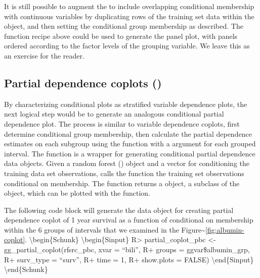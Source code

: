 \documentclass[article]{jss}
\begin{document}
It is still possible to augment the  to include
overlapping conditional membership with continuous variables by
duplicating rows of the training set data within the 
object, and then setting the conditional group membership as described.
The  function recipe above could be used to
generate the panel plot, with panels ordered according to the factor
levels of the grouping variable. We leave this as an exercise for the
reader.

\subsection[Partial dependence coplots]{Partial dependence coplots ()}\label{S:partialcoplots}

By characterizing conditional plots as stratified variable dependence
plots, the next logical step would be to generate an analogous
conditional partial dependence plot. The process is similar to variable
dependence coplots, first determine conditional group membership, then
calculate the partial dependence estimates on each subgroup using the
 function with a  argument for each
grouped interval. The  
function is a wrapper for generating conditional partial dependence data
objects. Given a random forest () object and a 
vector for conditioning the training data set observations,
 calls the  function the
training set observations conditional on  membership. The
function returns a  object, a subclass of the
 object, which can be plotted with the
 function.

The following code block will generate the data object for creating
partial dependence coplot of 1 year survival as a function of
 conditional on membership within the 6 groups of
 intervals that we examined in the
Figure\textasciitilde{}\ref{fig:albumin-coplot}.
\textbackslash{}begin\{Schunk\} \textbackslash{}begin\{Sinput\}
R\textgreater{} partial\_coplot\_pbc \textless{}-
gg\_partial\_coplot(rfsrc\_pbc, xvar = ``bili'', R+ groups =
ggvar\$albumin\_grp, R+ surv\_type = ``surv'', R+ time = 1, R+
show.plots = FALSE) \textbackslash{}end\{Sinput\}
\textbackslash{}end\{Schunk\}
\end{document}
